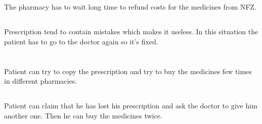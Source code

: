 \subsection{}
The pharmacy has to wait long time to refund costs for the medicines
from NFZ.

\subsection{}
Prescription tend to contain mistakes which makes it useless. In this situation the patient has to go to the doctor again so it's fixed.

\section{}

\subsection{}
Patient can try to copy the prescription and try to buy the medicines
few times in different pharmacies.

\subsection{}
Patient can claim that he has lost his prescription and ask the
doctor to give him another one. Then he can buy the medicines twice.
